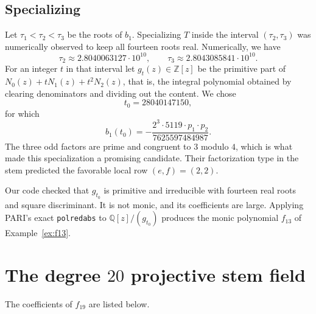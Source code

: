 \documentclass[10pt]{amsart}
\numberwithin{equation}{section}
\theoremstyle{definition}
\theoremstyle{remark}
\newcommand{\Q}{\mathbb{Q}}
\newcommand{\Z}{\mathbb{Z}}
\begin{document}
\subsection{Specializing}
Let $\tau_1<\tau_2<\tau_3$ be the roots of $b_1$.  Specializing $T$ inside
the interval $(\tau_2,\tau_3)$ was numerically observed to keep all fourteen
roots real. Numerically, we have 
\[
 \tau_2\approx2.8040063127\cdot10^{10},
 \qquad
 \tau_3\approx2.8043085841\cdot10^{10} .
\]
For an integer $t$ in that interval let $g_t(z)\in\Z[z]$ be the primitive
part of $N_0(z)+tN_1(z)+t^2N_2(z)$, that is, the integral polynomial obtained
by clearing denominators and dividing out the content.  We
chose
\[
 t_0=28040147150 ,
\]
for which
\begin{equation}\label{eq:l13-branch-factorization}
 b_1(t_0)=-\frac{2^3\cdot5119\cdot p_1\cdot p_2}{7625597484987} .
\end{equation}
The three odd factors are prime and congruent to $3$ modulo $4$, which is
what made this specialization a promising candidate. Their factorization
type in the stem predicted the favorable local row $(e,f)=(2,2)$.   

Our code checked that $g_{t_0}$ is primitive and irreducible with
fourteen real roots and square discriminant.  It is not monic, and its
coefficients are large. Applying PARI's exact \texttt{polredabs} to
$\Q[z]/(g_{t_0})$ produces the monic polynomial $f_{13}$ of
Example~\ref{ex:f13}. 

\section{The degree \texorpdfstring{$20$}{20} projective stem field}
\label{app:f19}

The coefficients of $f_{19}$ are listed below. 
\end{document}
